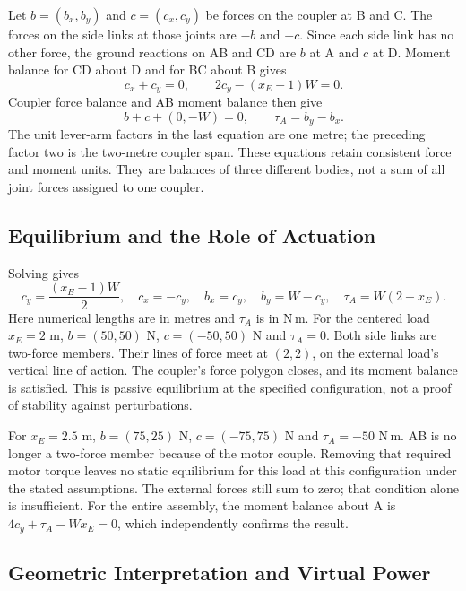 Let $b=(b_x,b_y)$ and $c=(c_x,c_y)$ be forces on the coupler at B and C. The forces on the side links at those joints are $-b$ and $-c$. Since each side link has no other force, the ground reactions on AB and CD are $b$ at A and $c$ at D. Moment balance for CD about D and for BC about B gives
\begin{equation}
 c_x+c_y=0,\qquad 2c_y-(x_E-1)W=0.
\end{equation}
Coupler force balance and AB moment balance then give
\begin{equation}
 b+c+(0,-W)=0,\qquad \tau_A=b_y-b_x.
\end{equation}
The unit lever-arm factors in the last equation are one metre; the preceding factor two is the two-metre coupler span. These equations retain consistent force and moment units. They are balances of three different bodies, not a sum of all joint forces assigned to one coupler.

\subsection{Equilibrium and the Role of Actuation}

Solving gives
\begin{equation}
 c_y=\frac{(x_E-1)W}{2},\quad c_x=-c_y,\quad
 b_x=c_y,\quad b_y=W-c_y,\quad \tau_A=W(2-x_E).
\end{equation}
Here numerical lengths are in metres and $\tau_A$ is in N\,m. For the centered load $x_E=2$ m, $b=(50,50)$ N, $c=(-50,50)$ N and $\tau_A=0$. Both side links are two-force members. Their lines of force meet at $(2,2)$, on the external load's vertical line of action. The coupler's force polygon closes, and its moment balance is satisfied. This is passive equilibrium at the specified configuration, not a proof of stability against perturbations.

For $x_E=2.5$ m, $b=(75,25)$ N, $c=(-75,75)$ N and $\tau_A=-50$ N\,m. AB is no longer a two-force member because of the motor couple. Removing that required motor torque leaves no static equilibrium for this load at this configuration under the stated assumptions. The external forces still sum to zero; that condition alone is insufficient. For the entire assembly, the moment balance about A is $4c_y+\tau_A-Wx_E=0$, which independently confirms the result.

\subsection{Geometric Interpretation and Virtual Power}

